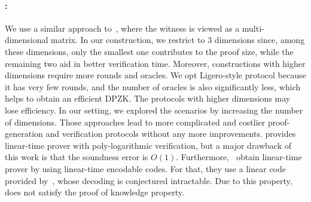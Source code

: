 \paragraph*{\name:}
We use a similar approach to~\cite{bootle2020linear, bootle2020zero}, where the witness is viewed as a multi-dimensional matrix. In our construction, we restrict to 3 dimensions since, among these dimensions, only the smallest one contributes to the proof size, while the remaining two aid in better verification time. Moreover, constructions with higher dimensions require more rounds and oracles. We opt Ligero-style protocol because it has very few rounds, and the number of oracles is also significantly less, which helps to obtain an efficient DPZK. The protocols with higher dimensions may lose efficiency.
In our setting, we explored the scenarios by increasing the number of dimensions. Those approaches lead to more complicated and costlier proof-generation and verification protocols without any more improvements. \cite{bootle2020zero} provides linear-time prover with poly-logarithmic verification, but a major drawback of this work is that the soundness error is $O(1)$. Furthermore,~\cite{bootle2020linear} obtain linear-time prover by using linear-time encodable codes. For that, they use a linear code provided by~\cite{druk2014linear}, whose decoding is conjectured intractable. Due to this property, ~\cite{bootle2020linear} does not satisfy the proof of knowledge property.


